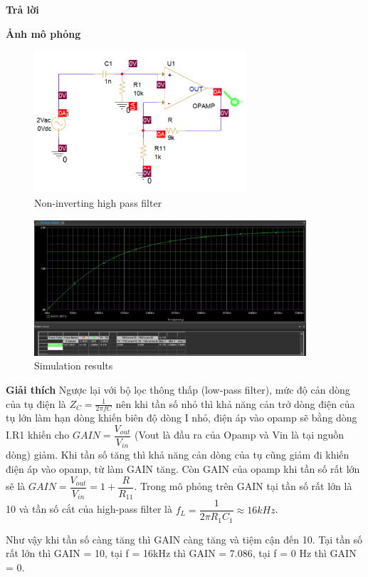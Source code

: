 \textbf{Trả lời}
\pagebreak

\textbf{Ảnh mô phỏng}

\begin{figure}[ht]
    \centering
    \includegraphics[width=0.7\textwidth]{graphics/ex1/f22.png}
    \caption{Non-inverting high pass filter}
\end{figure}

\begin{figure}[ht]
    \centering
    \includegraphics[width=0.9\textwidth]{graphics/ex1/f21.png}
    \caption{Simulation results}
\end{figure}
\pagebreak
\textbf{Giải thích} Ngược lại với bộ lọc thông thấp (low-pass filter), mức độ cản dòng của tụ điện là $Z_C = \frac{1}{2\pi fC}$ nên khi tần số nhỏ thì khả năng cản trở dòng điện của tụ lớn làm hạn dòng khiến biên độ dòng I nhỏ, điện áp vào opamp sẽ bằng dòng I.R1 khiến cho $GAIN = \dfrac{V_{out}}{V_{in}}$ (Vout là đầu ra của Opamp và Vin là tại nguồn dòng) giảm. Khi tần số tăng thì khả năng cản dòng của tụ cũng giảm đi khiến điện áp vào opamp, từ làm GAIN tăng. Còn GAIN của opamp khi tần số rất lớn sẽ là $GAIN = \dfrac{V_{out}}{V_{in}} = 1 + \dfrac{R}{R_{11}}$. Trong mô phỏng trên GAIN tại tần số rất lớn là 10 và tần số cắt của high-pass filter là $f_{L} = \dfrac{1}{2\pi R_1 C_1} \approx 16 kHz$. 

Như vậy khi tần số càng tăng thì GAIN càng tăng và tiệm cận đến 10. Tại tần số rất lớn thì GAIN = 10, tại f = 16kHz thì GAIN =  7.086, tại f = 0 Hz thì GAIN = 0. 

